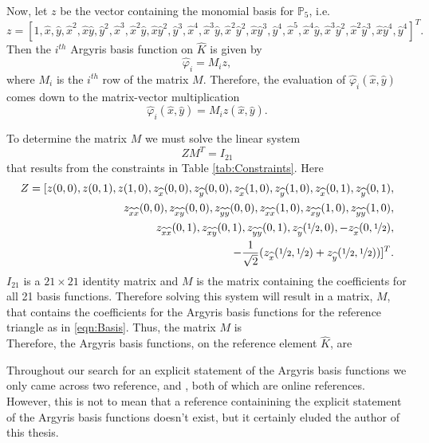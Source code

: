 

Now, let $z$ be the vector containing the monomial basis for $\mathbb{P}_5$, i.e.
\small{
\begin{equation*}
  z=\left[
    1, \hat{x}, \hat{y}, \hat{x}^2, \hat{x}\hat{y}, \hat{y}^2, \hat{x}^3, \hat{x}^2\hat{y}, \hat{x}\hat{y}^2, \hat{y}^3, \hat{x}^4, \hat{x}^3\hat{y},
    \hat{x}^2\hat{y}^2, \hat{x}\hat{y}^3, \hat{y}^4, \hat{x}^5, \hat{x}^4\hat{y}, \hat{x}^3\hat{y}^2, \hat{x}^2\hat{y}^3, \hat{x}\hat{y}^4, \hat{y}^4
  \right]^{T}.
\end{equation*}}
Then the $i^{th}$ Argyris basis function on $\hat{K}$ is given by
\begin{equation*}
  \hat{\varphi}_i = M_i z,
\end{equation*}
where $M_i$ is the $i^{th}$ row of the matrix $M$. Therefore, the evaluation of
$\hat{\varphi}_i(\hat{x},\hat{y})$ comes down to the matrix-vector multiplication
\begin{equation*}
  \hat{\varphi}_i(\hat{x},\hat{y}) = M_i z(\hat{x},\hat{y}).
\end{equation*}

To determine the matrix $M$ we must solve the linear system
\begin{equation*}
  ZM^T=I_{21}
\end{equation*}
that results from the constraints in Table \ref{tab:Constraints}. Here
\begin{equation*}
  \begin{split}Z=[z(0,0), z(0,1), z(1,0),
  z_{\hat{x}}(0,0), z_{\hat{y}}(0,0),
  z_{\hat{x}}(1,0), z_{\hat{y}}(1,0),
  z_{\hat{x}}(0,1), z_{\hat{y}}(0,1), \\
  z_{\hat{x}\hat{x}}(0,0), z_{\hat{x}\hat{y}}(0,0), z_{\hat{y}\hat{y}}(0,0),
  z_{\hat{x}\hat{x}}(1,0), z_{\hat{x}\hat{y}}(1,0), z_{\hat{y}\hat{y}}(1,0), \\
  z_{\hat{x}\hat{x}}(0,1), z_{\hat{x}\hat{y}}(0,1), z_{\hat{y}\hat{y}}(0,1),
  z_{\hat{y}}(\nicefrac{1}{2},0), -z_{\hat{x}}(0,\nicefrac{1}{2}), \\
  -\frac{1}{\sqrt{2}}(z_{\hat{x}}(\nicefrac{1}{2},\nicefrac{1}{2}) +
  z_{\hat{y}}(\nicefrac{1}{2},\nicefrac{1}{2}))]^T.\end{split}
\end{equation*}
$I_{21}$ is a $21\times 21$ identity matrix and $M$ is the matrix containing the
coefficients for all 21 basis functions. Therefore solving this system will
result in a matrix, $M$, that contains the coefficients for the Argyris basis
functions for the reference triangle as in \eqref{eqn:Basis}. Thus, the matrix
$M$ is \\

Therefore, the Argyris basis functions, on the reference element $\hat{K}$, are

\begin{remark}
  Throughout our search for an explicit statement of the Argyris basis functions
  we only came across two reference, \cite{Wiki} and \cite{FEM++}, both of which are
  online references. However, this is not to mean that a reference containining
  the explicit statement of the Argyris basis functions doesn't exist, but it
  certainly eluded the author of this thesis.
\end{remark}

